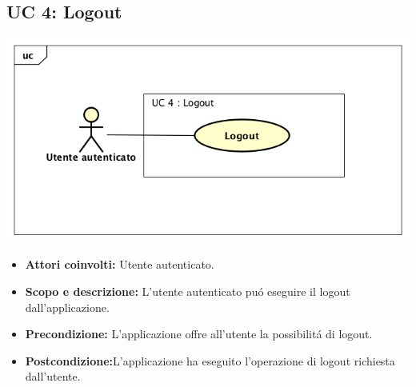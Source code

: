 \subsection{UC 4: Logout}
		
		\includegraphics[scale=0.8]{../../Casi D'uso/UC4.png}
\begin{itemize}
		\item \textbf{Attori coinvolti:} Utente autenticato. \\
		\item \textbf{Scopo e descrizione:} L'utente autenticato pu\'o eseguire il logout dall’applicazione. \\
		\item \textbf{Precondizione:} L'applicazione offre all'utente la possibilit\'a di logout. \\
		\item \textbf{Postcondizione:}L'applicazione ha eseguito l'operazione di logout richiesta dall’utente. \\
\end{itemize}